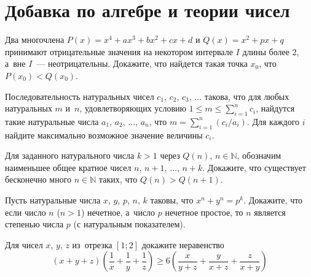 

\section*{Добавка по алгебре и теории чисел}


\begin{problems}

\item
Два многочлена $P(x) = x^4 + a x^3 + b x^2 + c x + d$ и $Q(x) = x^2 + p x + q$
принимают отрицательные значения на некотором интервале $I$ длины более $2$,
а~вне $I$~--- неотрицательны.
Докажите, что найдется такая точка $x_0$, что $P(x_0) < Q(x_0)$.

\item
Последовательность натуральных чисел $c_1$, $c_2$, $c_3$, $\ldots$ такова,
что для любых натуральных $m$ и~$n$, удовлетворяющих условию
$1 \leq m \leq \sum_{i=1}^{n} c_i$,
найдутся такие натуральные числа $a_1$, $a_2$, $\ldots$, $a_n$, что
$m = \sum_{i=1}^{n} (c_i / a_i)$.
Для каждого $i$ найдите максимально возможное значение величины $c_i$.

\item
Для заданного натурального числа $k > 1$ через $Q(n)$, $n \in \mathbb{N}$,
обозначим наименьшее общее кратное чисел $n$, $n+1$, $\ldots$, $n+k$.
Докажите, что существует бесконечно много $n \in \mathbb{N}$ таких, что
$Q(n) > Q(n+1)$.

\item
Пусть натуральные числа $x$, $y$, $p$, $n$, $k$ таковы, что $x^n + y^n = p^k$.
Докажите, что если число $n$ ($n > 1$) нечетное, а~число $p$ нечетное простое,
то $n$ является степенью числа $p$ (с натуральным показателем).

\item
Для чисел $x$, $y$, $z$ из~отрезка $[1; 2]$ докажите неравенство
\[
    (x + y + z)
    \left(
        \frac{1}{x} + \frac{1}{y} + \frac{1}{z}
    \right)
\geq
    6
    \left(
        \frac{x}{y + z} + \frac{y}{x + z} + \frac{z}{x + y}
    \right)
\]

\end{problems}

